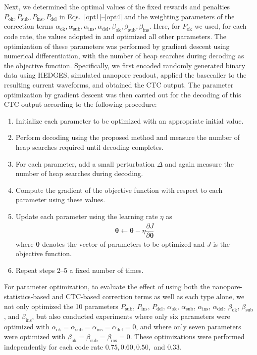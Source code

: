 \documentclass[sotsuron]{kuee}
\begin{document}
Next, we determined the optimal values of the fixed rewards and penalties
$P_{\mathrm{ok}}, P_{\mathrm{sub}}, P_{\mathrm{ins}}, P_{\mathrm{del}}$ in
Eqs.~\eqref{opt1}--\eqref{opt4} and the weighting parameters of the correction terms
$\alpha_{\mathrm{ok}}, \alpha_{\mathrm{sub}}, \alpha_{\mathrm{ins}}, \alpha_{\mathrm{del}},
\beta_{\mathrm{ok}}, \beta_{\mathrm{sub}}, \beta_{\mathrm{ins}}$.
Here, for $P_{\mathrm{ok}}$ we used, for each code rate, the values adopted in
\cite{HEDGES} and optimized all other parameters.
The optimization of these parameters was performed by gradient descent using numerical
differentiation, with the number of heap searches during decoding as the objective function.
Specifically, we first encoded randomly generated binary data using HEDGES, simulated nanopore
readout, applied the basecaller to the resulting current waveforms, and obtained the CTC output.
The parameter optimization by gradient descent was then carried out for the decoding of this
CTC output according to the following procedure:
\begin{enumerate}
    \item Initialize each parameter to be optimized with an appropriate initial value.
    \item Perform decoding using the proposed method and measure the number of heap searches
      required until decoding completes.
    \item For each parameter, add a small perturbation $\Delta$ and again measure the number
      of heap searches during decoding.
    \item Compute the gradient of the objective function with respect to each parameter using
      these values.
    \item Update each parameter using the learning rate $\eta$ as
  \begin{align}
    \bm{\theta} \leftarrow \bm{\theta} - \eta \dfrac{\partial J}{\partial \bm{\theta}}
  \end{align}
  where $\bm{\theta}$ denotes the vector of parameters to be optimized and $J$ is the
  objective function.
  \item Repeat steps 2--5 a fixed number of times.
\end{enumerate}
For parameter optimization, to evaluate the effect of using both the nanopore-statistics-based
and CTC-based correction terms as well as each type alone, we not only optimized the 10 parameters
$P_{\mathrm{sub}}$, $P_{\mathrm{ins}}$, $P_{\mathrm{del}}$, $\alpha_{\mathrm{ok}}$,
$\alpha_{\mathrm{sub}}$, $\alpha_{\mathrm{ins}}$, $\alpha_{\mathrm{del}}$,
$\beta_{\mathrm{ok}}$, $\beta_{\mathrm{sub}}$, and $\beta_{\mathrm{ins}}$, but also conducted
experiments where only six parameters were optimized with
$\alpha_{\mathrm{ok}}=\alpha_{\mathrm{sub}}=\alpha_{\mathrm{ins}}=\alpha_{\mathrm{del}}=0$,
and where only seven parameters were optimized with
$\beta_{\mathrm{ok}}=\beta_{\mathrm{sub}}=\beta_{\mathrm{ins}}=0$.
These optimizations were performed independently for each code rate
$0.75, 0.60, 0.50,$ and $0.33$.
\end{document}

